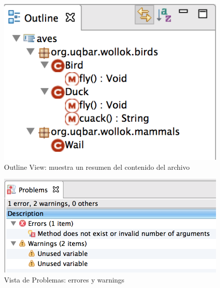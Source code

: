 \documentclass[preprint,10pt]{sigplanconf}
\begin{document}
	\begin{figure}[p]
	    \centering
		\includegraphics[scale=0.5]{images/wollok-paper-outline.png}
	    \caption{Outline View: muestra un resumen del contenido del archivo}
	    \label{fig:outline.png}
	\end{figure}
	
	\begin{figure}[p]
	    \centering
		\includegraphics[scale=0.5]{images/wollok-paper-check-problemsview.png}
	    \caption{Vista de Problemas: errores y warnings}
	    \label{fig:problemsview.png}
	\end{figure}
	
\end{document}

